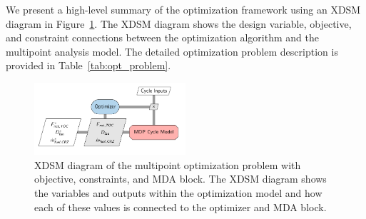 \documentclass[conf]{new-aiaa}
\begin{document}
We present a high-level summary of the optimization framework using an XDSM diagram in Figure~\ref{fig:N3_opt_xdsm}.
The XDSM diagram shows the design variable, objective, and constraint connections between the optimization algorithm and the multipoint analysis model.
The detailed optimization problem description is provided in Table~\ref{tab:opt_problem}.

\begin{figure}[!hbt]
  \centering
  \includegraphics[width=0.5\textwidth]{N3_opt_XDSM.pdf}
  \caption{
    XDSM diagram of the multipoint optimization problem with objective, constraints, and MDA block.
    The XDSM diagram shows the variables and outputs within the optimization model and how each of these values is connected to the optimizer and MDA block.}
  \label{fig:N3_opt_xdsm}
\end{figure}
\end{document}
